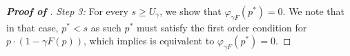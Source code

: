 \begin{proof}[\textbf{Proof of }]
   \textit{Step 3:} For every $s \geq U_{\gamma}$, we show that $\varphi_{\gamma F}(p^*) = 0$. We note that in that case, $p^* < s$ as such $p^*$ must satisfy the first order condition for $p \cdot (1-\gamma F(p))$, which implies is equivalent to $\varphi_{\gamma F}(p^*) = 0$. 
\end{proof}


